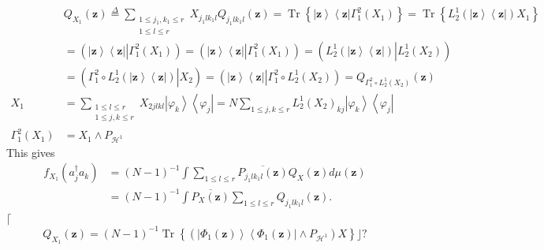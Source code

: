 \documentclass[aps,preprint]{revtex4}%
\begin{document}
\begin{align}
&  Q_{X_{1}}\left(  \mathbf{z}\right)  \overset{\Delta}{=}\sum
_{\substack{1\leq j_{1},k_{1}\leq r\\1\leq l\leq r}}X_{j_{1}lk_{1}l}%
Q_{j_{1}lk_{1}l}\left(  \mathbf{z}\right)  =\operatorname*{Tr}\left\{
\left\vert \mathbf{z}\right\rangle \left\langle \mathbf{z}\right\vert
\Gamma_{1}^{2}\left(  X_{1}\right)  \right\}  =\operatorname*{Tr}\left\{
L_{2}^{1}\left(  \left\vert \mathbf{z}\right\rangle \left\langle
\mathbf{z}\right\vert \right)  X_{1}\right\} \nonumber\\
&  =\left(  \left.  \overset{}{\left\vert \mathbf{z}\right\rangle \left\langle
\mathbf{z}\right\vert }\right\vert \Gamma_{1}^{2}\left(  X_{1}\right)
\right)  =\left(  \left.  \overset{}{\left\vert \mathbf{z}\right\rangle
\left\langle \mathbf{z}\right\vert }\right\vert \Gamma_{1}^{2}\left(
X_{1}\right)  \right)  =\left(  \left.  \overset{}{L_{2}^{1}\left(  \left\vert
\mathbf{z}\right\rangle \left\langle \mathbf{z}\right\vert \right)
}\right\vert L_{2}^{1}\left(  X_{2}\right)  \right) \nonumber\\
&  =\left(  \left.  \overset{}{\Gamma_{1}^{2}\circ L_{2}^{1}\left(  \left\vert
\mathbf{z}\right\rangle \left\langle \mathbf{z}\right\vert \right)
}\right\vert X_{2}\right)  =\left(  \left.  \overset{}{\left\vert
\mathbf{z}\right\rangle \left\langle \mathbf{z}\right\vert }\right\vert
\Gamma_{1}^{2}\circ L_{2}^{1}\left(  X_{2}\right)  \right)  =Q_{\Gamma_{1}%
^{2}\circ L_{2}^{1}\left(  X_{2}\right)  }\left(  \mathbf{z}\right)
\nonumber\\
X_{1}  &  =\sum_{\substack{1\leq l\leq r\\1\leq j,k\leq r}}X_{2jlkl}\left\vert
\varphi_{k}\right\rangle \left\langle \varphi_{j}\right\vert =N\sum_{1\leq
j,k\leq r}L_{2}^{1}\left(  X_{2}\right)  _{kj}\left\vert \varphi
_{k}\right\rangle \left\langle \varphi_{j}\right\vert \nonumber\\
\Gamma_{1}^{2}\left(  X_{1}\right)   &  =X_{1}\wedge P_{\mathcal{H}^{1}}%
\end{align}
This gives
\begin{align}
f_{X_{1}}\left(  a_{j}^{\dagger}a_{k}\right)   &  =\left(  N-1\right)
^{-1}\int\sum_{1\leq l\leq r}\overline{P_{j_{1}lk_{1}l}\left(  \mathbf{z}%
\right)  }Q_{X}\left(  \mathbf{z}\right)  d\mu\left(  \mathbf{z}\right) \\
&  =\left(  N-1\right)  ^{-1}\int\overline{P_{X}\left(  \mathbf{z}\right)
}\sum_{1\leq l\leq r}Q_{j_{1}lk_{1}l}\left(  \mathbf{z}\right)  .
\end{align}
$\lceil$%
\begin{equation}
Q_{X_{1}}\left(  \mathbf{z}\right)  =\left(  N-1\right)  ^{-1}%
\operatorname*{Tr}\left\{  \left(  \left\vert \Phi_{1}\left(  \mathbf{z}%
\right)  \right\rangle \left\langle \Phi_{1}\left(  \mathbf{z}\right)
\right\vert \wedge P_{\mathcal{H}^{1}}\right)  X\right\}  \rfloor?
\end{equation}
\end{document}
